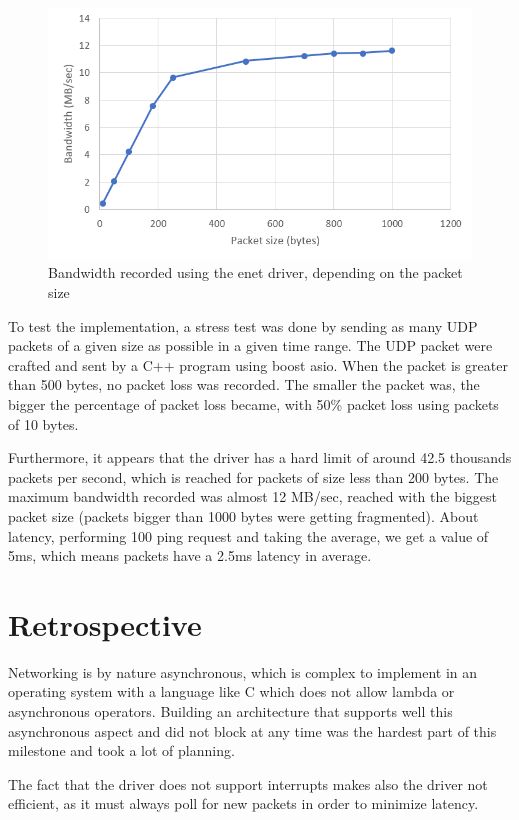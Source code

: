 \begin{figure}
    \centering
    \includegraphics[scale=0.7]{images/network/graph-perf.png}
    \caption{Bandwidth recorded using the enet driver, depending on the packet size}
    \label{fig:enter-label}
\end{figure}

To test the implementation, a stress test was done by sending as many UDP packets of a given size as possible in a given time range. The UDP packet were crafted and sent by a C++ program using boost asio. When the packet is greater than 500 bytes, no packet loss was recorded. The smaller the packet was, the bigger the percentage of packet loss became, with 50\% packet loss using packets of 10 bytes.

\medskip

Furthermore, it appears that the driver has a hard limit of around 42.5 thousands packets per second, which is reached for packets of size less than 200 bytes. The maximum bandwidth recorded was almost 12 MB/sec, reached with the biggest packet size (packets bigger than 1000 bytes were getting fragmented). About latency, performing 100 ping request and taking the average, we get a value of 5ms, which means packets have a 2.5ms latency in average.

\section{Retrospective}

Networking is by nature asynchronous, which is complex to implement in an operating system with a language like C which does not allow lambda or asynchronous operators. Building an architecture that supports well this asynchronous aspect and did not block at any time was the hardest part of this milestone and took a lot of planning.

The fact that the driver does not support interrupts makes also the driver not efficient, as it must always poll for new packets in order to minimize latency.
